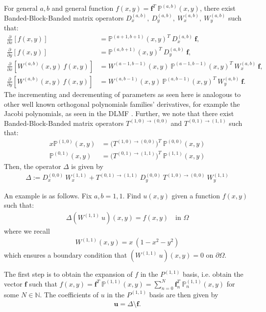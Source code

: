 \documentclass[11pt, oneside]{article}   	%
\newcommand{\N}{\mathbb{N}}
\newcommand{\bigP}{\mathbb{P}}
\newcommand{\Wab}{{W^{(a,b)}}}
\newcommand{\bigPab}{\bigP^{(a,b)}}
\newcommand{\Wii}{W^{(1,1)}}
\newcommand{\Pii}{P^{(1,1)}}
\newcommand{\dx}{\frac{\partial}{\partial x}}
\newcommand{\dy}{\frac{\partial}{\partial y}}
\begin{document}
For general \(a,b\) and general function \(f(x,y) = \mathbf{f}^T \: \bigPab(x,y)\), there exist Banded-Block-Banded matrix operators \(D_x^{(a,b)}, \: D_y^{(a,b)}, \: W_x^{(a,b)}, \: W_y^{(a,b)}\) such that:
\begin{align}
\dx[f(x,y)] &= \bigP^{(a+1,b+1)}(x,y)^T \: D_x^{(a,b)} \: \mathbf{f}, \\
\dy[f(x,y)] &= \bigP^{(a,b+1)}(x,y)^T \: D_y^{(a,b)} \: \mathbf{f}, \\
\dx[\Wab(x,y) \: f(x,y)] &= W^{(a-1,b-1)}(x,y) \: \bigP^{(a-1,b-1)}(x,y)^T \: W_x^{(a,b)} \: \mathbf{f}, \\
\dy[\Wab(x,y) \: f(x,y)] &= W^{(a,b-1)}(x,y) \: \bigP^{(a,b-1)}(x,y)^T \: W_y^{(a,b)} \: \mathbf{f}.
\end{align}
The incrementing and decrementing of parameters as seen here is analogous to other well known orthogonal polynomials families' derivatives, for example the Jacobi polynomials, as seen in the DLMF \cite{DLMFDerivatives}.
Further, we note that there exist Banded-Block-Banded matrix operators \(T^{(1,0)\to(0,0)}\) and \(T^{(0,1)\to(1,1)}\) such that:
\begin{align}
x \bigP^{(1,0)}(x,y) &= \Big(T^{(1,0)\to(0,0)} \Big)^T \: \bigP^{(0,0)}(x,y) \\
\bigP^{(0,1)}(x,y) &= \Big(T^{(0,1)\to(1,1)} \Big)^T \: \bigP^{(1,1)}(x,y)
\end{align}
Then, the operator \(\Delta\) is given by
\begin{align}
    \Delta := D_x^{(0,0)} \: W_x^{(1,1)} + T^{(0,1)\to(1,1)} \: D_y^{(0,0)} \: T^{(1,0)\to(0,0)} \: W_y^{(1,1)}
\end{align}

An example is as follows. Fix \(a, b = 1,1\). Find \(u(x,y)\) given a function \(f(x,y)\) such that:
\begin{align}
    \Delta(\Wii \: u)(x,y) = f(x,y) \quad \text{in } \Omega
    \end{align}
    where we recall
    \begin{align}
    \Wii(x,y) = x \: (1-x^2-y^2)
\end{align}
which ensures a boundary condition that \((\Wii \: u)(x,y) = 0\) on \(\partial \Omega\).

The first step is to obtain the expansion of \(f\) in the \(\Pii\) basis, i.e. obtain the vector \(\mathbf{f}\) such that \(f(x,y) = \mathbf{f}^T \: \bigP^{(1,1)}(x,y) = \sum_{n=0}^N \mathbf{f}_n^T \: \bigP_n^{(1,1)}(x,y)\) for some \(N \in \N\). The coefficients of \(u\) in the \(\Pii\) basis are then given by 
\begin{align}
    \mathbf{u} = \Delta \text{\textbackslash} \mathbf{f}.
\end{align}
\end{document}
